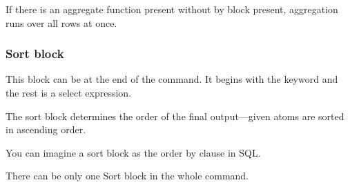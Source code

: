 If there is an aggregate function present without by block present, aggregation runs over all rows at once.

\subsubsection{Sort block}
This block can be at the end of the command. It begins with the  keyword and the rest is a select expression.

The sort block determines the order of the final output---given atoms are sorted in ascending order.

You can imagine a sort block as the order by clause in SQL.

There can be only one Sort block in the whole command.

